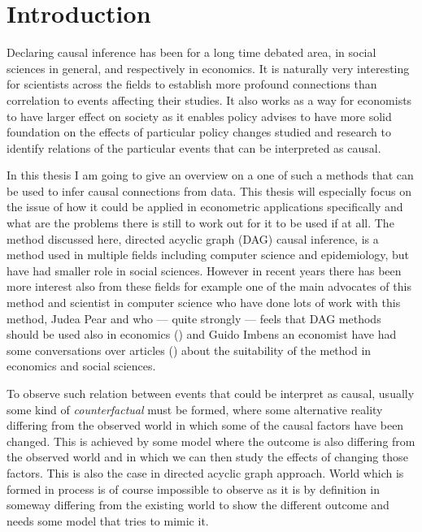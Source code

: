 \documentclass[main=english,12pt,a4paper,pdftex,econ,utf8]{aaltothesis}
\begin{document}
\section{Introduction}

\thispagestyle{empty}

Declaring causal inference has been for a long time debated area, in social sciences in general, and respectively in economics. It is naturally very interesting for scientists across the fields to establish more profound connections than correlation to events affecting their studies. It also works as a way for economists to have larger effect on society as it enables policy advises to have more solid foundation on the effects of particular policy changes studied and research to identify relations of the particular events that can be interpreted as causal.

In this thesis I am going to give an overview on a one of such a methods that can be used to infer causal connections from data. This thesis will especially focus on the issue of how it could be applied in econometric applications specifically and what are the problems there is still to work out for it to be used if at all. The method discussed here, directed acyclic graph (DAG) causal inference, is a method used in multiple fields including computer science and epidemiology, but have had smaller role in social sciences. However in recent years there has been more interest also from these fields for example one of the main advocates of this method and scientist in computer science who have done lots of work with this method, Judea Pear and who --- quite strongly --- feels that DAG methods should be used also in economics (\cite{pearl_2014}) and Guido Imbens an economist have had some conversations over articles (\cite{Imbens2014}) about the suitability of the method in economics and social sciences.

To observe such relation between events that could be interpret as causal, usually some kind of \textit{counterfactual} must be formed, where some alternative reality differing from the observed world in which some of the causal factors have been changed. This is achieved by some model where the outcome is also differing from the observed world and in which we can then study the effects of changing those factors. This is also the case in directed acyclic graph approach. World which is formed in process is of course impossible to observe as it is by definition in someway differing from the existing world to show the different outcome and needs some model that tries to mimic it.
\end{document}
